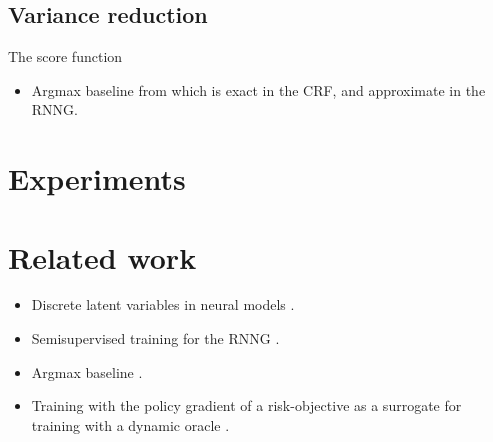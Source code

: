   \subsection{Variance reduction}
    The score function

    \begin{itemize}
      \item Argmax baseline from \citet{rennie2017argmax} which is exact in the CRF, and approximate in the RNNG.
    \end{itemize}

\section{Experiments}


\section{Related work}
  \begin{itemize}
    \item Discrete latent variables in neural models \citep{miao2016discrete,yin2018structvae}.
    \item Semisupervised training for the RNNG \citep{cheng2017rnng}.
    \item Argmax baseline \cite{rennie2017argmax}.
    \item Training with the policy gradient of a risk-objective as a surrogate for training with a dynamic oracle \citep{klein2018reinforce}.
  \end{itemize}
